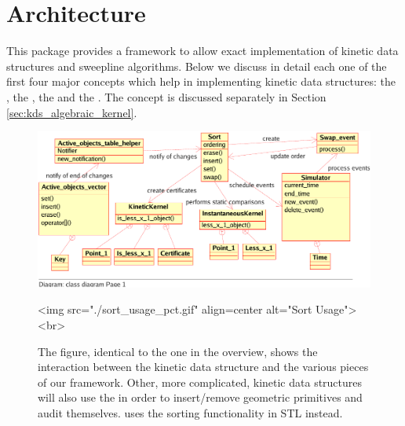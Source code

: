 
\section{Architecture\label{sec:kds_architecture}}


This package provides a framework to allow exact implementation of
kinetic data structures and sweepline algorithms. Below we discuss in
detail each one of the first four major concepts which help in
implementing kinetic data structures: the ,
the , the  and the
.  The 
concept is discussed separately in Section
\ref{sec:kds_algebraic_kernel}.

\begin{figure}
\begin{ccTexOnly}
\begin{center}
\includegraphics[scale=.8,viewport=0 18 470 250, clip]{Kinetic_data_structures/sort_usage_pct}
\end{center}
\end{ccTexOnly}
\begin{ccHtmlOnly}
<img src="./sort_usage_pct.gif" align=center alt="Sort Usage"><br>
\end{ccHtmlOnly}
\caption{\label{fig:kds_uml_usage_architecture} The figure, identical to the one in the
  overview, shows the interaction between the
   kinetic data structure and the
  various pieces of our framework.  Other, more complicated, kinetic
  data structures will also use the 
  in order to insert/remove geometric primitives and audit
  themselves.  uses the sorting
  functionality in STL instead.}
\end{figure}

